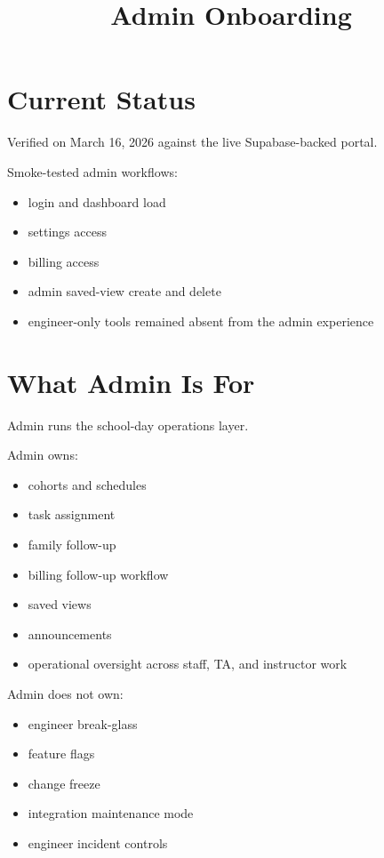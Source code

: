 \documentclass[11pt]{article}
\title{Admin Onboarding}
\author{}
\date{}
\begin{document}
\maketitle

\section*{Current Status}
Verified on March 16, 2026 against the live Supabase-backed portal.

Smoke-tested admin workflows:
\begin{itemize}
  \item login and dashboard load
  \item settings access
  \item billing access
  \item admin saved-view create and delete
  \item engineer-only tools remained absent from the admin experience
\end{itemize}

\section*{What Admin Is For}
Admin runs the school-day operations layer.

Admin owns:
\begin{itemize}
  \item cohorts and schedules
  \item task assignment
  \item family follow-up
  \item billing follow-up workflow
  \item saved views
  \item announcements
  \item operational oversight across staff, TA, and instructor work
\end{itemize}

Admin does not own:
\begin{itemize}
  \item engineer break-glass
  \item feature flags
  \item change freeze
  \item integration maintenance mode
  \item engineer incident controls
\end{itemize}
\end{document}
